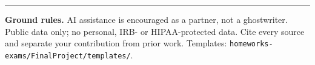 \documentclass[11pt]{article}
\begin{document}
\vfill
\noindent\rule{\linewidth}{0.4pt}\par
\small
\textbf{Ground rules.} AI assistance is encouraged as a partner, not a ghostwriter. Public data
only; no personal, IRB- or HIPAA-protected data. Cite every source and separate your contribution
from prior work. Templates: \texttt{homeworks-exams/FinalProject/templates/}.
\normalsize
\end{document}
